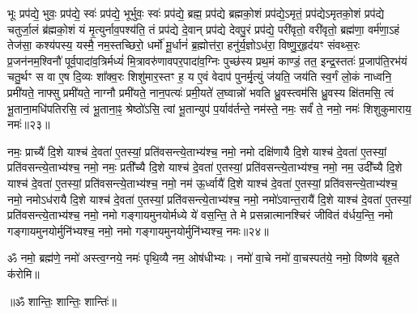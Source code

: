 भूः प्रप॑द्ये॒ भुवः॒ प्रप॑द्ये॒ स्वः॑ प्रप॑द्ये॒ भूर्भुवः॒ स्वः॑ प्रप॑द्ये॒ ब्रह्म॒ प्रप॑द्ये ब्रह्मको॒शं प्रप॑द्ये॒ऽमृतं॒ प्रप॑द्येऽमृतको॒शं प्रप॑द्ये चतुर्जा॒लं ब्र॑ह्मको॒शं यं मृ॒त्युर्नाव॒पश्य॑ति॒ तं प्रप॑द्ये दे॒वान् प्रप॑द्ये देवपु॒रं प्रप॑द्ये॒ परी॑वृतो॒ वरी॑वृतो॒ ब्रह्म॑णा॒ वर्म॑णा॒ऽहं तेज॑सा॒ कश्य॑पस्य॒ यस्मै॒ नम॒स्तच्छिरो॒ धर्मो॑ मू॒र्धानं॑ ब्र॒ह्मोत्त॑रा॒ हनु॑र्य॒ज्ञोऽध॑रा॒ विष्णु॒र्॒‌हृद॑यꣳ संवथ्स॒रः प्र॒जन॑नम॒श्विनौ॑ पूर्व॒पादा॑व॒त्रिर्मध्यं॑ मि॒त्रावरु॑णावपर॒पादा॑व॒ग्निः पुच्छ॑स्य प्रथ॒मं काण्डं॒ तत॒ इन्द्र॒स्ततः॑ प्र॒जाप॑ति॒रभ॑यं चतु॒र्थꣳ स वा ए॒ष दि॒व्यः शा᳚क्व॒रः शिशु॑मार॒स्तꣳ ह॒ य ए॒वं वेदाप॑ पुनर्मृ॒त्युं ज॑यति॒ जय॑ति स्व॒र्गं लो॒कं नाध्वनि॒ प्रमी॑यते॒ नाफ्सु प्रमी॑यते॒ नाग्नौ प्रमी॑यते॒ नान॒पत्यः॑ प्रमी॒यते॑ ल॒घ्वान्नो॑ भवति ध्रु॒वस्त्वम॑सि ध्रु॒वस्य क्षि॑तमसि॒ त्वं भू॒ताना॒मधि॑पतिरसि॒ त्वं भू॒ताना॒ꣴ॒ श्रेष्ठो॑ऽसि॒ त्वां भू॒तान्युप॑ प॒र्याव॑र्तन्ते॒ नम॑स्ते॒ नमः॒ सर्वं॑ ते॒ नमो॒ नमः॑ शिशुकुमाराय॒ नमः॑॥२३॥
\anuvakamend

नमः॒ प्राच्यै॑ दि॒शे याश्च॑ दे॒वता॑ ए॒तस्यां॒ प्रति॑वसन्त्ये॒ताभ्य॑श्च॒  नमो॒ नमो दक्षि॑णायै दि॒शे याश्च॑ दे॒वता॑ ए॒तस्यां॒ प्रति॑वसन्त्ये॒ताभ्य॑श्च॒  नमो॒ नमः॒ प्रती᳚च्यै दि॒शे याश्च॑ दे॒वता॑ ए॒तस्यां॒ प्रति॑वसन्त्ये॒ताभ्य॑श्च॒  नमो॒ नम॒ उदी᳚च्यै दि॒शे याश्च॑ दे॒वता॑ ए॒तस्यां॒ प्रति॑वसन्त्ये॒ताभ्य॑श्च॒  नमो॒ नम॑ ऊ॒र्ध्वायै॑ दि॒शे याश्च॑ दे॒वता॑ ए॒तस्यां॒ प्रति॑वसन्त्ये॒ताभ्य॑श्च॒  नमो॒ नमोऽध॑रायै दि॒शे याश्च॑ दे॒वता॑ ए॒तस्यां॒ प्रति॑वसन्त्ये॒ताभ्य॑श्च॒  नमो॒ नमो॑ऽवान्त॒रायै॑ दि॒शे याश्च॑ दे॒वता॑ ए॒तस्यां॒ प्रति॑वसन्त्ये॒ताभ्य॑श्च॒  नमो॒ नमो गङ्गायमुनयोर्मध्ये ये॑ वस॒न्ति॒ ते मे प्रसन्नात्मानश्चिरं जीवितं व॑र्धय॒न्ति॒ नमो गङ्गायमुनयोर्मुनि॑भ्यश्च॒ नमो॒ नमो गङ्गायमुनयोर्मुनि॑भ्यश्च॒ नमः॥२४॥
\anuvakamend

ॐ नमो॒ ब्रह्म॑णे॒ नमो॑ अस्त्व॒ग्नये॒ नमः॑ पृथि॒व्यै नम॒ ओष॑धीभ्यः। 
नमो॑ वा॒चे नमो॑ वा॒चस्पत॑ये॒ नमो॒ विष्ण॑वे बृह॒ते क॑रोमि॥\\
\centerline{॥ॐ शान्तिः॒ शान्तिः॒ शान्तिः॑॥}
